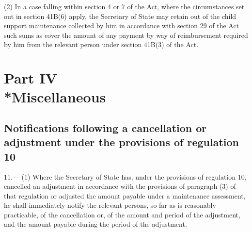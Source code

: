 \documentclass[12pt,a4paper]{article}
\begin{document}
(2) In a case falling within section 4 or 7 of the Act, where the circumstances set out in section 41B(6) apply, the Secretary of State may retain out of the child support maintenance collected by him in accordance with section 29 of the Act such sums as cover the amount of any payment by way of reimbursement required by him from the relevant person under section 41B(3) of the Act.


\section[Part IV --- Miscellaneous]{Part IV\\*Miscellaneous}

\renewcommand\parthead{--- Part IV}

\subsection[11. Notifications following a cancellation or adjustment under the provisions of regulation 10]{Notifications following a cancellation or adjustment under the provisions of regulation 10}

11.—%
(1) Where 
the Secretary of State  %
has, under the provisions of regulation 10, cancelled an adjustment in accordance with the provisions of paragraph (3) of that regulation or adjusted the amount payable under a maintenance assessment, he shall immediately notify the relevant persons, so far as is reasonably practicable, of the cancellation or, of the amount and period of the adjustment, and the amount payable during the period of the adjustment.
\end{document}
